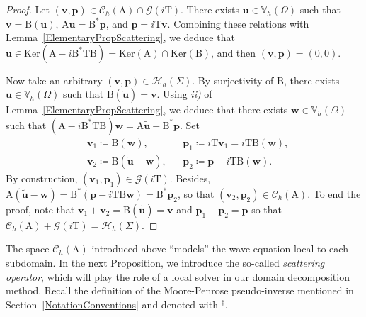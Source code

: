 \documentclass[a4paper,11pt]{article}
\newcommand{\mrm}{\mathrm}
\newcommand{\mA}{\mathrm{A}}
\newcommand{\mB}{\mathrm{B}}
\newcommand{\mT}{\mathrm{T}}
\newcommand{\mbV}{\mathbb{V}}
\newcommand{\bp}{\boldsymbol{p}}
\newcommand{\bu}{\boldsymbol{u}}
\newcommand{\bv}{\boldsymbol{v}}
\newcommand{\bw}{\boldsymbol{w}}
\begin{document}
\begin{proof}
  Let \((\bv,\bp)\in \mathscr{C}_h(\mA) \cap \mathscr{G}(i\mT)\). There exists \(\bu \in \mbV_h(\Omega)\) such that \(\bv = \mB ( \bu)\), \(\mA \bu = \mB^* \bp\), and \(\bp = i \mT \bv\). Combining these relations with Lemma~\ref{ElementaryPropScattering}, we deduce that \(\bu \in \mrm{Ker}(\mA - i \mB^* \mT \mB)= \mrm{Ker}(\mA) \cap \mrm{Ker}(\mB)\), and then \((\bv,\bp)=(0,0)\).

  Now take an arbitrary \((\bv,\bp)\in\mathscr{H}_h(\Sigma)\). By surjectivity of \(\mB\), there exists \(\tilde{\bu}\in \mbV_h(\Omega)\) such that \(\mB(\tilde{\bu})=\bv\). Using \textit{ii)} of Lemma~\ref{ElementaryPropScattering}, we deduce that there exists \(\bw \in \mbV_h(\Omega)\) such that \((\mA-i\mB^*\mT\mB)\bw = \mA \tilde{\bu}-\mB^*\bp\). Set
  \begin{align*}
    &\bv_1 \coloneq \mB(\bw), && \bp_1 \coloneq i \mT \bv_1 = i \mT \mB(\bw),\\
    &\bv_2 \coloneq \mB(\tilde{\bu}-\bw), && \bp_2 \coloneq \bp - i \mT \mB(\bw).
  \end{align*}
  By construction, \((\bv_1,\bp_1)\in \mathscr{G}(i \mT)\). Besides, \(\mA ( \tilde{\bu}-\bw) = \mB^*(\bp - i\mT \mB \bw)= \mB^* \bp_2\), so that \((\bv_2,\bp_2)\in \mathscr{C}_h(\mA)\). To end the proof, note that \( \bv_1+\bv_2 = \mB(\tilde{\bu}) = \bv\) and \(\bp_1+\bp_2=\bp\) so that \(\mathscr{C}_h(\mA) + \mathscr{G}(i\mT)=\mathscr{H}_h(\Sigma)\).
\end{proof}

The space $\mathscr{C}_h(\mA)$ introduced above ``models'' the wave
equation local to each subdomain. In the next Proposition, we introduce the so-called
\emph{scattering operator}, which will play the role of a local solver
in our domain decomposition method. Recall the
definition of the Moore-Penrose pseudo-inverse mentioned in
Section~\ref{NotationConventions} and denoted with \(^{\dagger}\).
\end{document}
